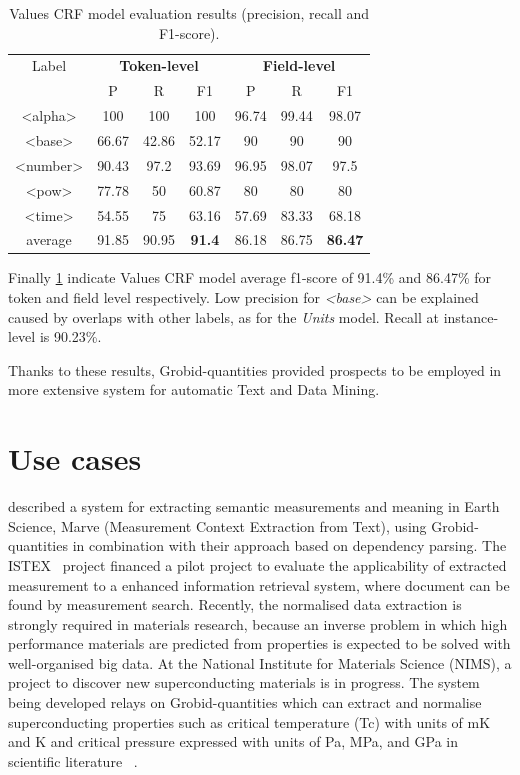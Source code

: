 \documentclass[sigconf]{acmart}
\begin{document}
\begin{table}[ht]
  \caption{Values CRF model evaluation results (precision, recall and F1-score).}
  \label{tab:values-evaluation}
  \begin{tabular}{c|ccc|ccc}
    \toprule
    Label & \multicolumn{3}{c}{\textbf{Token-level}} & \multicolumn{3}{c}{\textbf{Field-level}}\\
    & P & R & F1 & P & R & F1 \\
    \midrule
    <alpha>       & 100   & 100   & 100   & 96.74 & 99.44 & 98.07   \\
    <base>        & 66.67 & 42.86 & 52.17 & 90    & 90    & 90      \\
    <number>      & 90.43 & 97.2  & 93.69 & 96.95 & 98.07 & 97.5    \\
    <pow>         & 77.78 & 50    & 60.87 & 80    & 80    & 80      \\
    <time>        & 54.55 & 75    & 63.16 & 57.69 & 83.33 & 68.18   \\
    \midrule
    average       & 91.85 & 90.95 & \textbf{91.4} & 86.18 & 86.75 & \textbf{86.47}   \\
    \bottomrule
     \end{tabular}
\end{table}

Finally \ref{tab:values-evaluation} indicate Values CRF model average f1-score of 91.4\% and 86.47\% for token and field level respectively. Low precision for \textit{<base>} can be explained caused by overlaps with other labels, as for the  \textit{Units} model. Recall at instance-level is 90.23\%.  

Thanks to these results, Grobid-quantities provided prospects to be employed in more extensive system for automatic Text and Data Mining. 

\section{Use cases}
\label{sec:use_cases}
\cite{hundman2017measurement} described a system for extracting semantic measurements and meaning in Earth Science, Marve (Measurement Context Extraction from Text), using Grobid-quantities in combination with their approach based on dependency parsing. The ISTEX~\cite{dazy2014istex} project financed a pilot project to evaluate the applicability of extracted measurement to a enhanced information retrieval system, where document can be found by measurement search. Recently, the normalised data extraction is strongly required in materials research, because an inverse problem in which high performance materials are predicted from properties is expected to be solved with well-organised big data. At the National Institute for Materials Science (NIMS), a project to discover new superconducting materials is in progress. The system being developed relays on Grobid-quantities which can extract and normalise superconducting properties such as critical temperature (Tc) with units of mK and K and critical pressure expressed with units of Pa, MPa, and GPa in scientific literature ~\cite{foppiano2019proposal}. 
\end{document}
